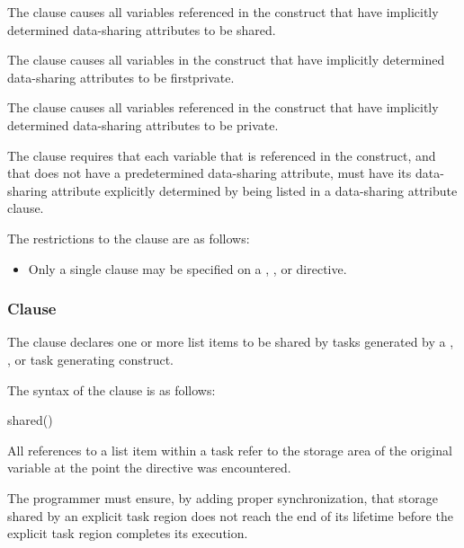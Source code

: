 \descr
The  clause causes all variables referenced in the construct 
that have implicitly determined data-sharing attributes to be shared.

\begin{fortranspecific}
The  clause causes all variables in the construct that 
have implicitly determined data-sharing attributes to be firstprivate.

The  clause causes all variables referenced in the construct 
that have implicitly determined data-sharing attributes to be private.
\end{fortranspecific}

The  clause requires that each variable that is referenced 
in the construct, and that does not have a predetermined data-sharing attribute, 
must have its data-sharing attribute explicitly determined by being listed in a 
data-sharing attribute clause.

\restrictions
The restrictions to the  clause are as follows:

\begin{itemize}
\item Only a single  clause may be specified on a
      , ,  or  directive.
\end{itemize}



\subsubsection{ Clause}
\label{subsubsec:shared clause}
\summary
The  clause declares one or more list items to be shared by 
tasks generated by a , , or task generating construct.

\syntax
The syntax of the  clause is as follows:

\begin{ompSyntax}
shared()
\end{ompSyntax}

\descr
All references to a list item within a task refer to the storage area of the 
original variable at the point the directive was encountered.

The programmer must ensure, by adding proper synchronization, that storage 
shared by an explicit task region does not reach the end of its lifetime before
the explicit task region completes its execution.


